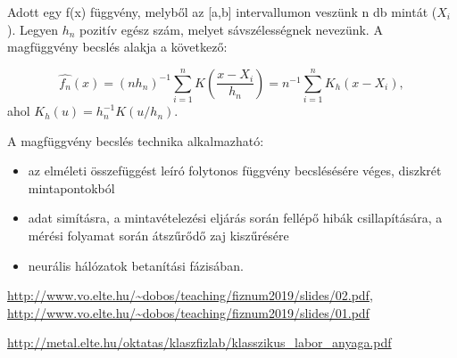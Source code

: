 \documentclass[12pt]{article}
\theoremstyle{plain}
\begin{document}
Adott egy f(x) függvény, melyből az [a,b] intervallumon veszünk n db mintát ($X_i$). Legyen $h_n$ pozitív egész szám, melyet sávszélességnek nevezünk. A magfüggvény becslés alakja a következő: 

$$
\hat{f_n}(x) = (n h_n)^{-1} \sum_{i=1}^n K(\frac{x-X_i}{h_n}) = n^{-1} \sum_{i=1}^n K_h(x-X_i),
$$ ahol $K_h(u) = h_n^{-1}K(u/h_n)$. 

A magfüggvény becslés technika alkalmazható: 
\begin{itemize}
    \item az elméleti összefüggést leíró folytonos függvény becslésésére véges, diszkrét mintapontokból
    \item adat simításra, a mintavételezési eljárás során fellépő hibák csillapítására, a mérési folyamat során átszűrődő zaj kiszűrésére
    \item neurális hálózatok betanítási fázisában. 
\end{itemize}



%
%

\begin{thebibliography}

\url{http://www.vo.elte.hu/~dobos/teaching/fiznum2019/slides/02.pdf}, \url{http://www.vo.elte.hu/~dobos/teaching/fiznum2019/slides/01.pdf}

\url{http://metal.elte.hu/oktatas/klaszfizlab/klasszikus_labor_anyaga.pdf}

\end{thebibliography}
\end{document}
